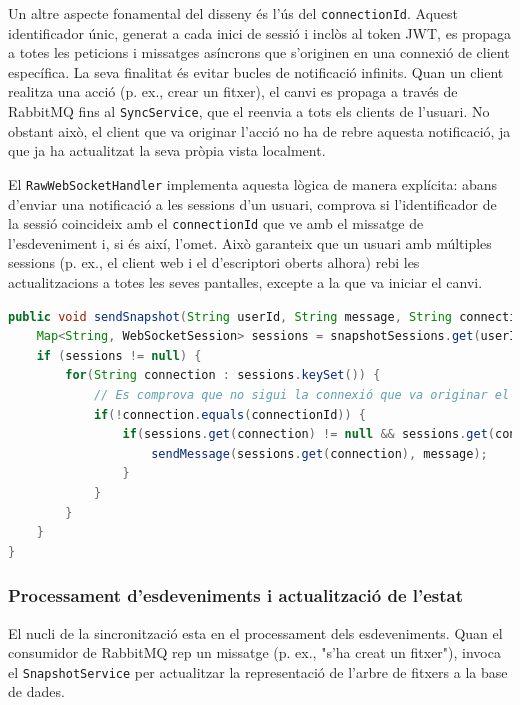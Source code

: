 Un altre aspecte fonamental del disseny és l'ús del \texttt{connectionId}. Aquest identificador únic, generat a cada inici de sessió i inclòs al token JWT, es propaga a totes les peticions i missatges asíncrons que s'originen en una connexió de client específica. La seva finalitat és evitar bucles de notificació infinits. Quan un client realitza una acció (p. ex., crear un fitxer), el canvi es propaga a través de RabbitMQ fins al \texttt{SyncService}, que el reenvia a tots els clients de l'usuari. No obstant això, el client que va originar l'acció no ha de rebre aquesta notificació, ja que ja ha actualitzat la seva pròpia vista localment.

El \texttt{RawWebSocketHandler} implementa aquesta lògica de manera explícita: abans d'enviar una notificació a les sessions d'un usuari, comprova si l'identificador de la sessió coincideix amb el \texttt{connectionId} que ve amb el missatge de l'esdeveniment i, si és així, l'omet. Això garanteix que un usuari amb múltiples sessions (p. ex., el client web i el d'escriptori oberts alhora) rebi les actualitzacions a totes les seves pantalles, excepte a la que va iniciar el canvi.

\begin{lstlisting}[language=Java, caption={Exclusió de la connexió origen a `RawWebSocketHandler`}]
public void sendSnapshot(String userId, String message, String connectionId) throws IOException {
    Map<String, WebSocketSession> sessions = snapshotSessions.get(userId);
    if (sessions != null) {
        for(String connection : sessions.keySet()) {
            // Es comprova que no sigui la connexió que va originar el canvi
            if(!connection.equals(connectionId)) {
                if(sessions.get(connection) != null && sessions.get(connection).isOpen()) {
                    sendMessage(sessions.get(connection), message);
                }
            }
        }
    }
}
\end{lstlisting}

\subsubsection{Processament d'esdeveniments i actualització de l'estat}

El nucli de la sincronització esta en el processament dels esdeveniments. Quan el consumidor de RabbitMQ rep un missatge (p. ex., "s'ha creat un fitxer"), invoca el \texttt{SnapshotService} per actualitzar la representació de l'arbre de fitxers a la base de dades.

